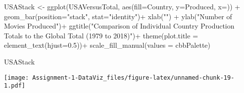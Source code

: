 \documentclass[
]{article}
\newenvironment{Shaded}{\begin{snugshade}}{\end{snugshade}}
\newcommand{\AttributeTok}[1]{\textcolor[rgb]{0.77,0.63,0.00}{#1}}
\newcommand{\FloatTok}[1]{\textcolor[rgb]{0.00,0.00,0.81}{#1}}
\newcommand{\FunctionTok}[1]{\textcolor[rgb]{0.00,0.00,0.00}{#1}}
\newcommand{\NormalTok}[1]{#1}
\newcommand{\OtherTok}[1]{\textcolor[rgb]{0.56,0.35,0.01}{#1}}
\newcommand{\SpecialCharTok}[1]{\textcolor[rgb]{0.00,0.00,0.00}{#1}}
\newcommand{\StringTok}[1]{\textcolor[rgb]{0.31,0.60,0.02}{#1}}
\begin{document}
\begin{Shaded}
\begin{Highlighting}[]
\NormalTok{USAStack }\OtherTok{\textless{}{-}} \FunctionTok{ggplot}\NormalTok{(USAVersusTotal, }\FunctionTok{aes}\NormalTok{(}\AttributeTok{fill=}\NormalTok{Country, }\AttributeTok{y=}\NormalTok{Produced, }\AttributeTok{x=}\StringTok{\textquotesingle{}\textquotesingle{}}\NormalTok{)) }\SpecialCharTok{+} 
  \FunctionTok{geom\_bar}\NormalTok{(}\AttributeTok{position=}\StringTok{"stack"}\NormalTok{, }\AttributeTok{stat=}\StringTok{"identity"}\NormalTok{)}\SpecialCharTok{+}
  \FunctionTok{xlab}\NormalTok{(}\StringTok{""}\NormalTok{) }\SpecialCharTok{+} 
  \FunctionTok{ylab}\NormalTok{(}\StringTok{"Number of Movies Produced"}\NormalTok{)}\SpecialCharTok{+}
  \FunctionTok{ggtitle}\NormalTok{(}\StringTok{"Comparison of Individual Country Production Totals to the Global Total (1979 to 2018)"}\NormalTok{)}\SpecialCharTok{+}
  \FunctionTok{theme}\NormalTok{(}\AttributeTok{plot.title =} \FunctionTok{element\_text}\NormalTok{(}\AttributeTok{hjust=}\FloatTok{0.5}\NormalTok{))}\SpecialCharTok{+}
  \FunctionTok{scale\_fill\_manual}\NormalTok{(}\AttributeTok{values =}\NormalTok{ cbbPalette)}
  



\NormalTok{USAStack }
\end{Highlighting}
\end{Shaded}

\texttt{[image: Assignment-1-DataViz\_files/figure-latex/unnamed-chunk-19-1.pdf]}
\end{document}
